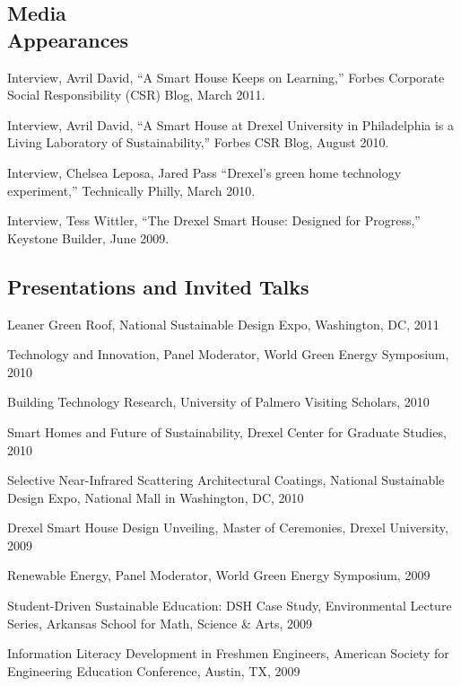 \documentclass[margin]{res}
\begin{document}
\begin{resume}
\begin{educate}
\section{Media \\ Appearances}
\begin{list}{}{\leftmargin=1em} \itemsep -2pt %
\item Interview, Avril David, ``A Smart House Keeps on Learning,'' Forbes Corporate Social Responsibility (CSR) Blog, March 2011.
\item Interview, Avril David, ``A Smart House at Drexel University in Philadelphia is a Living Laboratory of Sustainability,'' Forbes CSR Blog, August 2010.
\item Interview, Chelsea Leposa, Jared Pass ``Drexel's green home technology experiment,'' Technically Philly, March 2010.
\item Interview, Tess Wittler, ``The Drexel Smart House: Designed for Progress,'' Keystone Builder, June 2009.
\end{list}
\end{educate}

\begin{educate}
\section{Presentations and Invited Talks}
\begin{list}{}{\leftmargin=1em} \itemsep -2pt %
\item Leaner Green Roof, National Sustainable Design Expo, Washington, DC, 2011
\item Technology and Innovation, Panel Moderator, World Green Energy Symposium, 2010 
\item Building Technology Research, University of Palmero Visiting Scholars, 2010 
\item Smart Homes and Future of Sustainability, Drexel Center for Graduate Studies, 2010 
\item Selective Near-Infrared Scattering Architectural Coatings, National Sustainable Design Expo, National Mall in Washington, DC, 2010 
\item Drexel Smart House Design Unveiling, Master of Ceremonies, Drexel University, 2009 
\item Renewable Energy, Panel Moderator, World Green Energy Symposium, 2009 
\item Student-Driven Sustainable Education: DSH Case Study, Environmental Lecture Series, Arkansas School for Math, Science \& Arts, 2009 
\item Information Literacy Development in Freshmen Engineers, American Society for Engineering Education Conference, Austin, TX, 2009 


\end{list}
\end{educate}
\end{resume}
\end{document}
